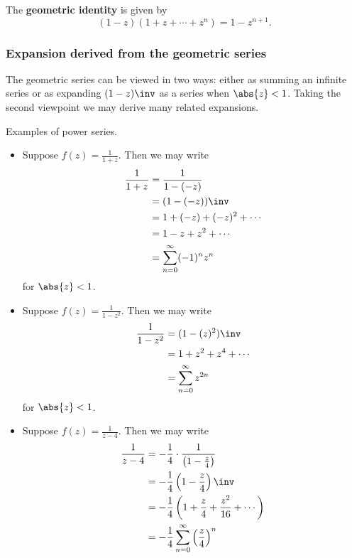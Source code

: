\documentclass[12pt, a4paper]{article}
\begin{document}
\begin{definition}
    The \textbf{geometric identity} is given by 
    \[(1-z)(1+z+\cdots +z^n)= 1-z^{n+1}.\]
\end{definition}

\subsubsection{Expansion derived from the geometric series}

The geometric series can be viewed in two ways: either as summing an infinite series or as expanding \((1-z)\inv\) as a series when \(\abs{z}<1\). Taking the second viewpoint we may derive many related expansions.

\begin{example}
    Examples of power series.
    \begin{itemize}
        \item Suppose \(f(z) = \frac{1}{1+z}\). Then we may write 
        \[\begin{aligned}
            \frac{1}{1+z} &= \frac{1}{1-(-z)} \\
            &= (1-(-z))\inv \\
            &= 1 + (-z) +(-z)^2 + \cdots \\
            &= 1 - z +z^2 + \cdots \\
            &= \sum_{n=0}^{\infty} (-1)^n z^n  
        \end{aligned}\]
        for \(\abs{z}<1\).
        \item Suppose \(f(z)= \frac{1}{1-z^2}\). Then we may write 
        \[\begin{aligned}
            \frac{1}{1-z^2} &= (1-(z)^2)\inv \\
            &= 1+z^2+z^4 + \cdots \\
            &= \sum_{n=0}^{\infty} z^{2n}
        \end{aligned}\]
        for \(\abs{z} <1\).
        \item Suppose \(f(z) = \frac{1}{z-4}\). Then we may write
        \[\begin{aligned}
            \frac{1}{z-4} &= -\frac{1}{4} \cdot \frac{1}{\left(1-\frac{z}{4}\right)} \\
            &= -\frac{1}{4} \left( 1- \frac{z}{4} \right)\inv \\
            &= -\frac{1}{4} \left( 1+\frac{z}{4} +\frac{z^2}{16} + \cdots \right)\\
            &= - \frac{1}{4} \sum_{n=0}^{\infty} \left( \frac{z}{4} \right)^n \\

\end{aligned}\]
\end{itemize}
\end{example}
\end{document}

